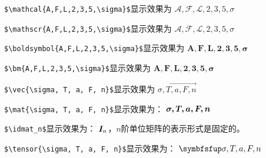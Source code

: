 \begin{example}[mathcal测试]
    \texttt{\$\textbackslash mathcal\{A,F,L,2,3,5,\textbackslash sigma\}\$}显示效果为 $\mathcal{A,F,L,2,3,5,\sigma}$
\end{example}
\begin{example}[mathscr测试]
    \texttt{\$\textbackslash mathscr\{A,F,L,2,3,5,\textbackslash sigma\}\$}显示效果为 $\mathscr{A,F,L,2,3,5,\sigma}$
\end{example}
\begin{example}[boldsymbol测试]
    \texttt{\$\textbackslash boldsymbol\{A,F,L,2,3,5,\textbackslash sigma\}\$}显示效果为 $\boldsymbol{A,F,L,2,3,5,\sigma}$
\end{example}
\begin{example}[bm测试]
    \texttt{\$\textbackslash bm\{A,F,L,2,3,5,\textbackslash sigma\}\$}显示效果为 $\bm{A,F,L,2,3,5,\sigma}$
\end{example}
\begin{example}[向量命令测试]
\texttt{\$\textbackslash vec\{\textbackslash sigma, T, a, F, n\}\$}显示效果为 $\vec{\sigma, T, a, F, n}$
\end{example}
\begin{example}[矩阵命令测试]
    \texttt{\$\textbackslash mat\{\textbackslash sigma, T, a, F, n\}\$}显示效果为： $\bm{\sigma, T, a, F, n}$
\end{example}
\begin{example}[单位矩阵命令测试]
    \texttt{\$\textbackslash idmat\_n\$}显示效果为： $\bm{I}_n$，$n$阶单位矩阵的表示形式是固定的。
\end{example}
\begin{example}[张量命令测试]
    \verb|$\tensor{\sigma, T, a, F, n}$|显示效果为： $\tensor{\sigma, T, a, F, n}$
\end{example}

